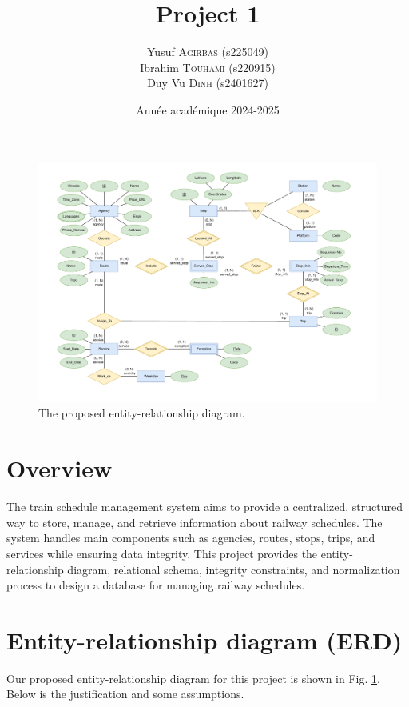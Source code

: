 \documentclass[a4paper, 12pt]{article}
\title{Project 1}
\author{
Yusuf \textsc{Agirbas} (s225049)\\
Ibrahim \textsc{Touhami} (s220915) \\
Duy Vu \textsc{Dinh} (s2401627)\\
}
\date{Année académique 2024-2025}
\begin{document}


\newpage


\begin{landscape}

\begin{figure}[ht]
    \centering
    \includegraphics[width=1\linewidth]{./resources/figures/_final_project1_2025-03-14-Final.drawio.pdf}
    \caption{The proposed entity-relationship diagram.}
    \label{fig:ERD}
\end{figure}
\end{landscape}

\section*{Overview}

The train schedule management system aims to provide a centralized, structured way to store, manage, and retrieve information about railway schedules. The system handles main components such as agencies, routes, stops, trips, and services while ensuring data integrity. This project provides the entity-relationship diagram, relational schema, integrity constraints, and normalization process to design a database for managing railway schedules.

\section{Entity-relationship diagram (ERD)} \label{sec:1}

Our proposed entity-relationship diagram for this project is shown in Fig. \ref{fig:ERD}. Below is the justification and some assumptions.
\end{document}
